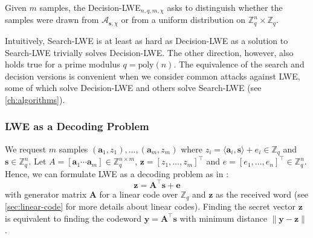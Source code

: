 \begin{definition}
    Given $m$ samples, the Decision-LWE$_{n, q, m, \chi}$ asks to distinguish whether the samples were drawn from $\mathcal{A}_{\mathbf{s}, \chi}$ or from a uniform distribution on $\mathbb{Z}_q^n \times \mathbb{Z}_q$.
\end{definition}

Intuitively, Search-LWE is at least as hard as Decision-LWE as a solution to Search-LWE trivially solves Decision-LWE. The other direction, however, also holds true \cite{Reg09} for a prime modulus $q=\text{poly}(n)$. %
The equivalence of the search and decision versions is convenient when we consider common attacks against LWE, some of which solve Decision-LWE and others solve Search-LWE (see \cref{ch:algorithms}).

% 


\subsubsection{LWE as a Decoding Problem} \label{sec:lwe-decoding}
We request $m$ samples $(\mathbf{a}_1, z_1), \ldots, (\mathbf{a}_m, z_m)$ where $z_i = \langle \mathbf{a}_i, \mathbf{s} \rangle + e_i \in \mathbb{Z}_q$ and $\mathbf{s} \in \mathbb{Z}_q^n$. Let $A = \left[ \mathbf{a}_1 \cdots \mathbf{a}_m\right] \in \mathbb{Z}_q^{n\times m}$, $\mathbf{z} = \left[z_1, \ldots, z_m\right]^\intercal$ and $e = \left[e_1, \ldots, e_n\right]^\intercal \in \mathbb{Z}_q^n$. Hence, we can formulate LWE as a decoding problem as in \cite{GJS15}:
\begin{equation} \label{eq:lwe-decoding}
    \mathbf{z} =  \mathbf{A}^\intercal \mathbf{s} + \mathbf{e}
\end{equation}
with generator matrix $\mathbf{A}$ for a linear code over $\mathbb{Z}_q$ and $\mathbf{z}$ as the received word (see \cref{sec:linear-code} for more details about linear codes). Finding the secret vector $\mathbf{z}$ is equivalent to finding the codeword $\mathbf{y} = \mathbf{A}^\intercal\mathbf{s}$ with minimum distance $\| \mathbf{y} - \mathbf{z} \|$.

